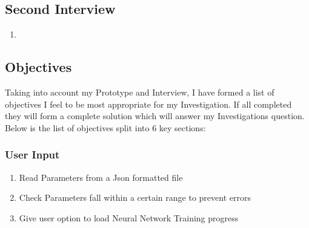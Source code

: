 \begin{flushleft}
        \subsection{Second Interview}
            
            \vspace{0.2cm}

            \begin{enumerate}
                \item 
            \end{enumerate}

            \pagebreak

        \subsection{Objectives}
            \large
            Taking into account my Prototype and Interview, I have formed a list of objectives I feel to be most 
            appropriate for my Investigation.
            If all completed they will form a complete solution which will answer my Investigations question.
            Below is the list of objectives split into 6 key sections:

            \subsubsection*{User Input}
                \begin{enumerate}
                    \item Read Parameters from a Json formatted file
                    \item Check Parameters fall within a certain range to prevent errors
                    \item Give user option to load Neural Network Training progress
                \end{enumerate}

\end{flushleft}
